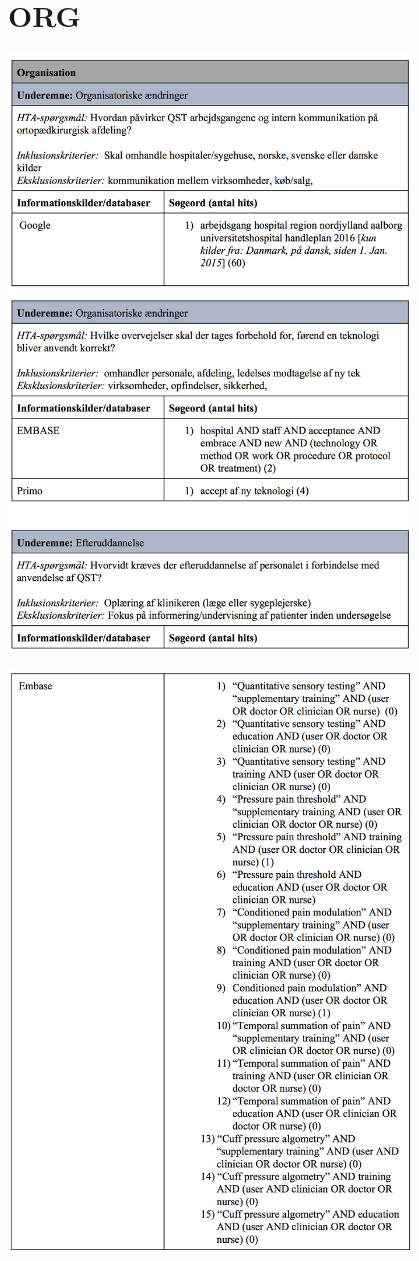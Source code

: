 \section{ORG}
\includegraphics[width=0.8\textwidth]{rapportAfsnit/qBilag/sogninger/ORG1}

\includegraphics[width=0.8\textwidth]{rapportAfsnit/qBilag/sogninger/ORG2}

